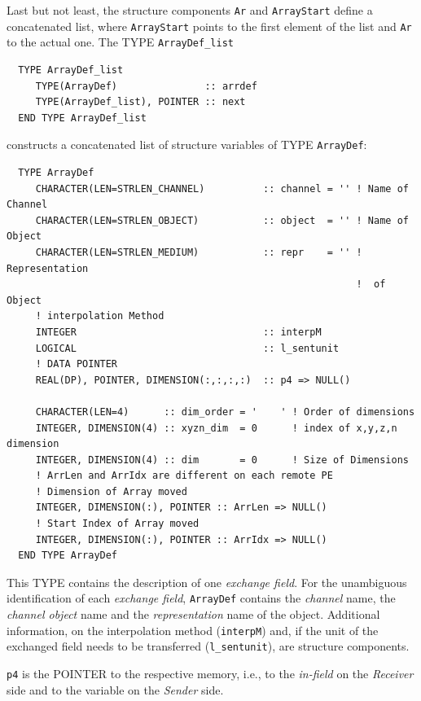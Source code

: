 \documentclass[twoside]{article}
\begin{document}
Last but not least, the structure components \verb|Ar| and \verb|ArrayStart|
define a concatenated list, where  \verb|ArrayStart| points to the
first element of the list and \verb|Ar| to the actual one. The
{\footnotesize TYPE} 
 \verb|ArrayDef_list|
\begin{verbatim}
  TYPE ArrayDef_list
     TYPE(ArrayDef)               :: arrdef
     TYPE(ArrayDef_list), POINTER :: next
  END TYPE ArrayDef_list
\end{verbatim}
constructs a concatenated list of structure variables of {\footnotesize TYPE}
 \verb|ArrayDef|:

\begin{verbatim}
  TYPE ArrayDef
     CHARACTER(LEN=STRLEN_CHANNEL)          :: channel = '' ! Name of Channel  
     CHARACTER(LEN=STRLEN_OBJECT)           :: object  = '' ! Name of Object
     CHARACTER(LEN=STRLEN_MEDIUM)           :: repr    = '' ! Representation
                                                            !  of Object
     ! interpolation Method
     INTEGER                                :: interpM      
     LOGICAL                                :: l_sentunit 
     ! DATA POINTER
     REAL(DP), POINTER, DIMENSION(:,:,:,:)  :: p4 => NULL()

     CHARACTER(LEN=4)      :: dim_order = '    ' ! Order of dimensions
     INTEGER, DIMENSION(4) :: xyzn_dim  = 0      ! index of x,y,z,n dimension
     INTEGER, DIMENSION(4) :: dim       = 0      ! Size of Dimensions
     ! ArrLen and ArrIdx are different on each remote PE
     ! Dimension of Array moved   
     INTEGER, DIMENSION(:), POINTER :: ArrLen => NULL()
     ! Start Index of Array moved        
     INTEGER, DIMENSION(:), POINTER :: ArrIdx => NULL() 
  END TYPE ArrayDef
\end{verbatim}

This {\footnotesize TYPE} contains the description of one {\it exchange field}.
For the unambiguous identification of each {\it exchange field}, 
\verb|ArrayDef| contains the 
{\it channel} name, the {\it channel object} name and the {\it representation}
 name of the object. Additional information, on the interpolation method
 (\verb|interpM|) and, if the unit of the exchanged field needs to be
 transferred  (\verb|l_sentunit|), are structure components.

\verb|p4| is the {\footnotesize POINTER} to the respective memory,
 i.e., to the  
{\it in-field} on the {\it Receiver} side and to the variable on the
{\it Sender} side. 
\end{document}
